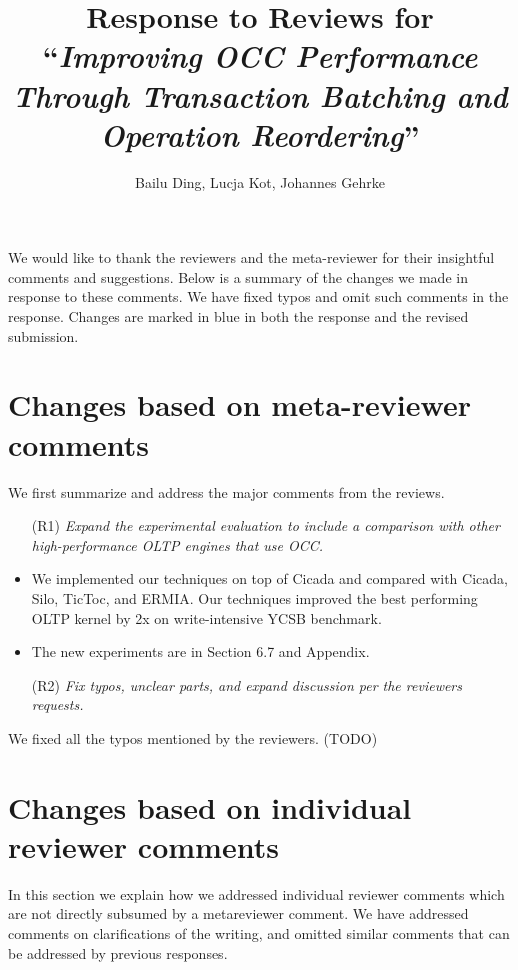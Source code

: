 \documentclass{article}
\newcommand{\changed}[1]{#1}
\newcommand{\changed}[1]{{\color{blue}#1}}
\begin{document}
\title{Response to Reviews for ``\emph{Improving OCC Performance Through Transaction Batching and Operation Reordering}''}
\author{Bailu Ding, Lucja Kot, Johannes Gehrke}
\date{}
\maketitle

We would like to thank the reviewers and the meta-reviewer for their insightful comments and suggestions. Below is a summary of the changes we made in response to these comments. We have fixed typos and omit such comments in the response. Changes are marked in blue in both the response and the revised submission.

\section{Changes based on meta-reviewer comments}

We first summarize and address the major comments from the reviews.

\begin{itemize}
	\item[(R1)] \emph{Expand the experimental evaluation to include a comparison with other high-performance OLTP engines that use OCC.}
\end{itemize}

\changed{
	\begin{itemize}
		\item We implemented our techniques on top of Cicada and compared with Cicada, Silo, TicToc, and ERMIA. Our techniques improved the best performing OLTP kernel by 2x on write-intensive YCSB benchmark.
		\item The new experiments are in Section 6.7 and Appendix.
	\end{itemize}
}

\begin{itemize}
	\item[(R2)] \emph{Fix typos, unclear parts, and expand discussion per the reviewers requests.}
\end{itemize}

\changed{
	We fixed all the typos mentioned by the reviewers. (TODO)
}

\section{Changes based on individual reviewer comments}

In this section we explain how we addressed individual reviewer comments which are not directly subsumed by a metareviewer comment. We have addressed comments on clarifications of the writing, and omitted similar comments that can be addressed by previous responses.
\end{document}
